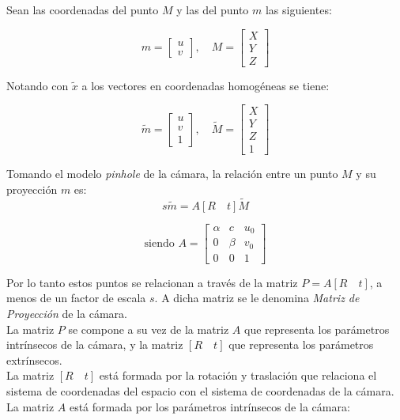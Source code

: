 Sean las coordenadas del punto  $M$ y las del punto $m$ las siguientes:


\[m = \begin{bmatrix}
u \\ 
v
\end{bmatrix} , \quad
M = \begin{bmatrix}
X \\ 
Y \\
Z
\end{bmatrix} \]

Notando con $\tilde{x}$ a los vectores en coordenadas homogéneas se tiene:


\[\tilde{m} = \begin{bmatrix}
u \\ 
v \\
1
\end{bmatrix} , \quad
\tilde{M} = \begin{bmatrix}
X \\ 
Y \\
Z \\
1
\end{bmatrix} \]

Tomando el modelo \textit{pinhole} de la cámara, la relación entre un punto $M$ y su proyección $m$ es:
\begin{equation}
s\tilde{m} = A [R \quad t]\tilde{M}
\label{proyeccion}
\end{equation}




\begin{equation}
\text{siendo }
A = \begin{bmatrix}
\alpha & c & u_0 \\ 
0 & \beta & v_0 \\ 
0 & 0 & 1
\end{bmatrix} 
\end{equation}

Por lo tanto estos puntos se relacionan a través de la matriz $P = A [R \quad t]$, a menos de un factor de escala $s$. A dicha matriz  se le denomina \emph{Matriz de Proyección} de la cámara.\\

La matriz $P$ se compone a su vez de la matriz $A$ que representa los parámetros intrínsecos de la cámara, y la matriz $[R \quad t]$ que representa los parámetros extrínsecos.\\

La matriz $[R \quad t]$ está formada por la rotación y traslación que relaciona el sistema de coordenadas del espacio con el sistema de coordenadas de la cámara. La matriz $A$ está formada por los parámetros intrínsecos de la cámara:\\




